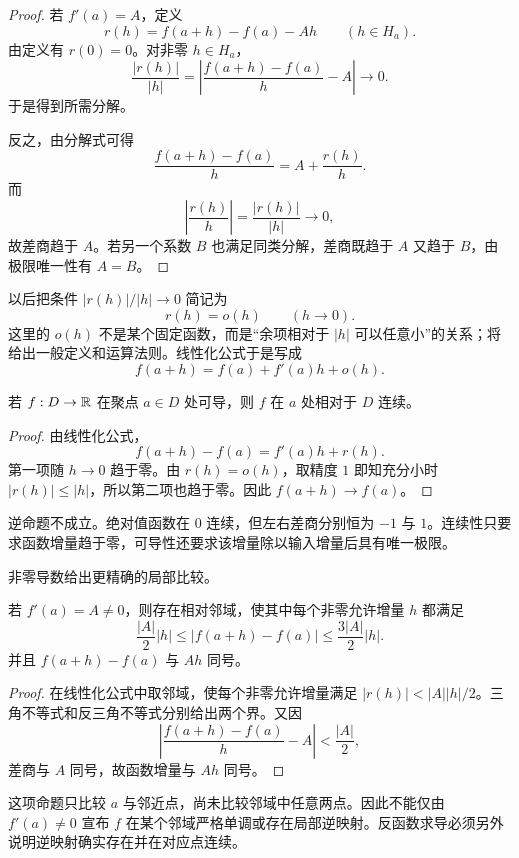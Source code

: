 \begin{proof}
若 \(f'(a)=A\)，定义
\[
 r(h)=f(a+h)-f(a)-Ah\qquad(h\in H_a).
\]
由定义有 \(r(0)=0\)。对非零 \(h\in H_a\)，
\[
 \frac{|r(h)|}{|h|}
 =\left|\frac{f(a+h)-f(a)}{h}-A\right|\longrightarrow0.
\]
于是得到所需分解。

反之，由分解式可得
\[
 \frac{f(a+h)-f(a)}h=A+\frac{r(h)}h.
\]
而
\[
 \left|\frac{r(h)}h\right|=\frac{|r(h)|}{|h|}\longrightarrow0,
\]
故差商趋于 \(A\)。若另一个系数 \(B\) 也满足同类分解，差商既趋于 \(A\) 又趋于 \(B\)，由极限唯一性有 \(A=B\)。
\end{proof}

以后把条件 \(|r(h)|/|h|\to0\) 简记为
\[
 r(h)=o(h)\qquad(h\to0).
\]
这里的 \(o(h)\) 不是某个固定函数，而是“余项相对于 \(|h|\) 可以任意小”的关系；将给出一般定义和运算法则。线性化公式于是写成
\[
 f(a+h)=f(a)+f'(a)h+o(h).
\]

\begin{theorem}[可导推出连续]
若 \(f:D\to\mathbb{R}\) 在聚点 \(a\in D\) 处可导，则 \(f\) 在 \(a\) 处相对于 \(D\) 连续。
\end{theorem}

\begin{proof}
由线性化公式，
\[
 f(a+h)-f(a)=f'(a)h+r(h).
\]
第一项随 \(h\to0\) 趋于零。由 \(r(h)=o(h)\)，取精度 \(1\) 即知充分小时 \(|r(h)|\le |h|\)，所以第二项也趋于零。因此 \(f(a+h)\to f(a)\)。
\end{proof}

逆命题不成立。绝对值函数在 \(0\) 连续，但左右差商分别恒为 \(-1\) 与 \(1\)。连续性只要求函数增量趋于零，可导性还要求该增量除以输入增量后具有唯一极限。

非零导数给出更精确的局部比较。

\begin{proposition}[非零线性项的控制]
若 \(f'(a)=A\ne0\)，则存在相对邻域，使其中每个非零允许增量 \(h\) 都满足
\[
 \frac{|A|}{2}|h|
 \le |f(a+h)-f(a)|
 \le \frac{3|A|}{2}|h|.
\]
并且 \(f(a+h)-f(a)\) 与 \(Ah\) 同号。
\end{proposition}

\begin{proof}
在线性化公式中取邻域，使每个非零允许增量满足 \(|r(h)|<|A||h|/2\)。三角不等式和反三角不等式分别给出两个界。又因
\[
 \left|\frac{f(a+h)-f(a)}h-A\right|<\frac{|A|}{2},
\]
差商与 \(A\) 同号，故函数增量与 \(Ah\) 同号。
\end{proof}

这项命题只比较 \(a\) 与邻近点，尚未比较邻域中任意两点。因此不能仅由 \(f'(a)\ne0\) 宣布 \(f\) 在某个邻域严格单调或存在局部逆映射。反函数求导必须另外说明逆映射确实存在并在对应点连续。

